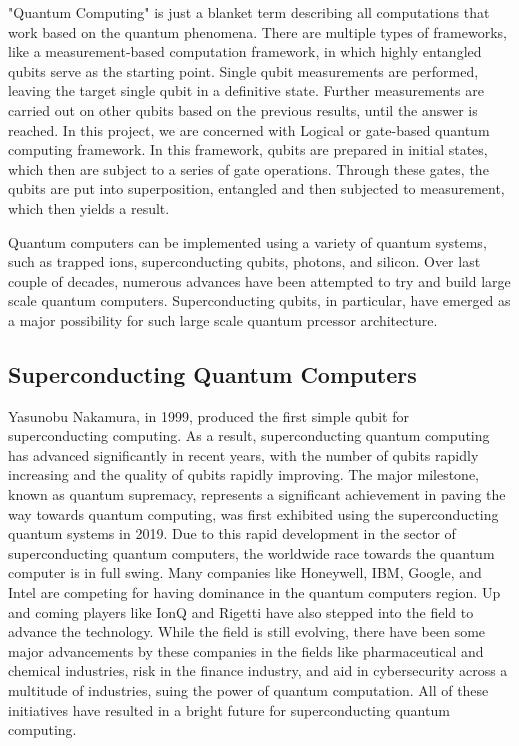 \documentclass{article}
\begin{document}
\noindent
"Quantum Computing" is just a blanket term describing all computations that work based on the quantum phenomena. There are multiple types of frameworks, like a measurement-based computation framework, in which highly entangled qubits serve as the starting point. Single qubit measurements are performed, leaving the target single qubit in a definitive state. Further measurements are carried out on other qubits based on the previous results, until the answer is reached. In this project, we are concerned with Logical or gate-based quantum computing framework. In this framework, qubits are prepared in initial states, which then are subject to a series of gate operations. Through these gates, the qubits are put into superposition, entangled and then subjected to measurement, which then yields a result. 
\vspace{5mm}

\noindent
Quantum computers can be implemented using a variety of quantum systems, such as trapped ions, superconducting qubits, photons, and silicon. Over last couple of decades, numerous advances have been attempted to try and build large scale quantum computers. Superconducting qubits, in particular, have emerged as a major possibility for such large scale quantum prcessor architecture.

\noindent
\subsection{Superconducting Quantum Computers}
\noindent
Yasunobu Nakamura, in 1999, produced the first simple qubit for superconducting computing. As a result, superconducting quantum computing has advanced significantly in recent years, with the number of qubits rapidly increasing and the quality of qubits rapidly improving. The major milestone, known as quantum supremacy, represents a significant achievement in paving the way towards quantum computing, was first exhibited using the superconducting quantum systems in 2019. Due to this rapid development in the sector of superconducting quantum computers, the worldwide race towards the quantum computer is in full swing.%
Many companies like Honeywell, IBM, Google, and Intel are competing for having dominance in the quantum computers region. Up and coming players like IonQ and Rigetti have also stepped into the field to advance the technology. While the field is still evolving, there have been some major advancements by these companies in the fields like pharmaceutical and chemical industries, risk in the finance industry, and aid in cybersecurity across a multitude of industries, suing the power of quantum computation.   %
All of these initiatives have resulted in a bright future for superconducting quantum computing. %
\end{document}
